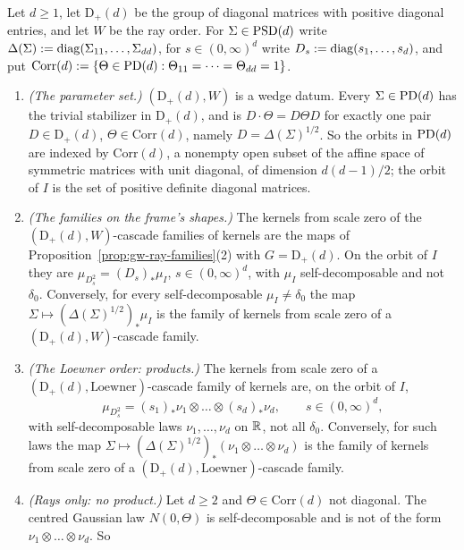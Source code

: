 \begin{proposition}\label{prop:diagonal-ray-families}
Let $d \ge 1$, let $\mathrm D_+(d)$ be the group of diagonal matrices with positive diagonal entries, and
let $W$ be the ray order. For $\Sigma \in \mathrm{PSD}(d)$ write $\Delta(\Sigma) := \operatorname{diag}(\Sigma_{11}, \dots,
\Sigma_{dd})$, for $s \in (0,\infty)^d$ write $D_s := \operatorname{diag}(s_1, \dots, s_d)$, and put
$\mathrm{Corr}(d) := \{\Theta \in \mathrm{PD}(d) : \Theta_{11} = \dots = \Theta_{dd} = 1\}$.
\begin{enumerate}
\item \emph{(The parameter set.)} $(\mathrm D_+(d), W)$ is a wedge datum. Every $\Sigma \in \mathrm{PD}(d)$ has
the trivial stabilizer in $\mathrm D_+(d)$, and is $D\cdot \Theta = D\Theta D$ for exactly one pair
$D \in \mathrm D_+(d)$, $\Theta \in \mathrm{Corr}(d)$, namely $D = \Delta(\Sigma)^{1/2}$. So the orbits in
$\mathrm{PD}(d)$ are indexed by $\mathrm{Corr}(d)$, a nonempty open subset of the affine space of symmetric
matrices with unit diagonal, of dimension $d(d-1)/2$; the orbit of $I$ is the set of positive definite
diagonal matrices.
\item \emph{(The families on the frame's shapes.)} The kernels from scale zero of the
$(\mathrm D_+(d), W)$-cascade families of kernels are the maps of Proposition~\ref{prop:gw-ray-families}(2) with
$G = \mathrm D_+(d)$. On the orbit of $I$ they are $\mu_{D_s^2} = (D_s)_*\mu_I$, $s \in (0,\infty)^d$, with
$\mu_I$ self-decomposable and not $\delta_0$. Conversely, for every self-decomposable $\mu_I \ne \delta_0$
the map $\Sigma \mapsto (\Delta(\Sigma)^{1/2})_*\mu_I$ is the family of kernels from scale zero of a
$(\mathrm D_+(d), W)$-cascade family.
\item \emph{(The Loewner order: products.)} The kernels from scale zero of a
$(\mathrm D_+(d), \text{Loewner})$-cascade family of kernels are, on the orbit of $I$,
\[
  \mu_{D_s^2} = (s_1)_*\nu_1 \otimes \dots \otimes (s_d)_*\nu_d , \qquad s \in (0,\infty)^d ,
\]
with self-decomposable laws $\nu_1, \dots, \nu_d$ on $\mathbb{R}$, not all $\delta_0$. Conversely, for such laws
the map $\Sigma \mapsto (\Delta(\Sigma)^{1/2})_*(\nu_1 \otimes \dots \otimes \nu_d)$ is the family of kernels
from scale zero of a $(\mathrm D_+(d), \text{Loewner})$-cascade family.
\item \emph{(Rays only: no product.)} Let $d \ge 2$ and $\Theta \in \mathrm{Corr}(d)$ not diagonal. The centred
Gaussian law $N(0,\Theta)$ is self-decomposable and is not of the form $\nu_1 \otimes \dots \otimes \nu_d$. So

\end{enumerate}
\end{proposition}
